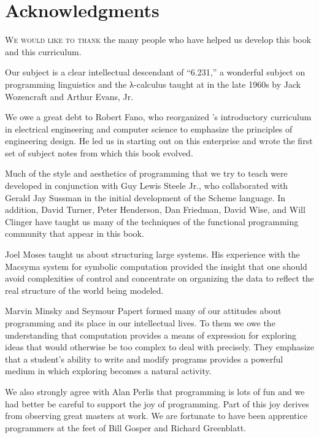 \chapter*{Acknowledgments}
\label{Acknowledgments}

\lettrine[findent=1pt]{W}{e would like to thank} the many people who have helped us develop this book and this curriculum.

Our subject is a clear intellectual descendant of “6.231,” a wonderful subject on programming linguistics and the λ-calculus taught at  in the late 1960s by Jack Wozencraft and Arthur Evans, Jr.

We owe a great debt to Robert Fano, who reorganized ’s introductory curriculum in electrical engineering and computer science to emphasize the principles of engineering design. 
He led us in starting out on this enterprise and wrote the first set of subject notes from which this book evolved.

Much of the style and aesthetics of programming that we try to teach were developed in conjunction with Guy Lewis Steele Jr., who collaborated with Gerald Jay Sussman in the initial development of the Scheme language.
In addition, David Turner, Peter Henderson, Dan Friedman, David Wise, and Will Clinger have taught us many of the techniques of the functional programming community that appear in this book.

Joel Moses taught us about structuring large systems.
His experience with the Macsyma system for symbolic computation provided the insight that one should avoid complexities of control and concentrate on organizing the data to reflect the real structure of the world being modeled.

Marvin Minsky and Seymour Papert formed many of our attitudes about programming and its place in our intellectual lives.
To them we owe the understanding that computation provides a means of expression for exploring ideas that would otherwise be too complex to deal with precisely.
They emphasize that a student's ability to write and modify programs provides a powerful medium in which exploring becomes a natural activity.

We also strongly agree with Alan Perlis that programming is lots of fun and we had better be careful to support the joy of programming.
Part of this joy derives from observing great masters at work.
We are fortunate to have been apprentice programmers at the feet of Bill Gosper and Richard Greenblatt.

